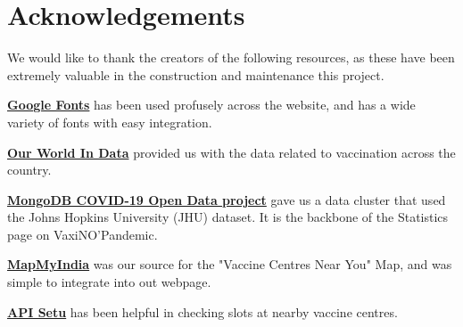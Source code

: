 \documentclass{article}
\begin{document}
\section{Acknowledgements}
We would like to thank the creators of the following resources, as these have been extremely valuable in the construction and maintenance this project.
\begin{description}
\item{\href{https://fonts.google.com/}{\color{blue}\textbf{Google Fonts}}} has been used profusely across the website, and has a wide variety of fonts with easy integration.
\item{\href{https://ourworldindata.org/covid-vaccinations?country=IND}{\color{blue}\textbf{Our World In Data}}} \cite{owidcoronavirus} provided us with the data related to vaccination across the country.
\item{\href{https://github.com/mongodb-developer/open-data-covid-19#collection-global}{\color{blue}\textbf{MongoDB COVID-19 Open Data project}}} gave us a data cluster that used the Johns Hopkins University (JHU) dataset. It is the backbone of the Statistics page on VaxiNO'Pandemic.
\item{\href{https://www.mapmyindia.com/api/corona/#State-wise-corona-cases}{\color{blue}\textbf{MapMyIndia}}} was our source for the "Vaccine Centres Near You" Map, and was simple to integrate into out webpage.
\item{\href{https://apisetu.gov.in/api/cowin/cowin-public-v2}{\color{blue}\textbf{API Setu}}} has been helpful in checking slots at nearby vaccine centres.
\end{description}



\end{document}
